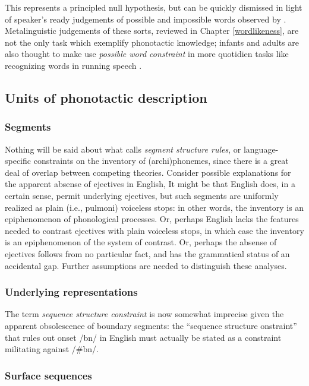 This represents a principled null hypothesis, but can be quickly dismissed in light of speaker's ready judgements of possible and impossible words observed by \citeauthor{Chomsky1965}. Metalinguistic judgements of these sorts, reviewed in Chapter \ref{wordlikeness}, are not the only task which exemplify phonotactic knowledge; infants and adults are also thought to make use \emph{possible word constraint} in more quotidien tasks like recognizing words in running speech \citep[e.g.,][]{Brown1956,Mattys1999,McQueen1998b,Norris1997}.

\subsection{Units of phonotactic description}

\subsubsection{Segments}

Nothing will be said about what \citet{Stanley1967} calls \emph{segment structure rules}, or language-specific constraints on the inventory of (archi)phonemes, since there is a great deal of overlap between competing theories. Consider possible explanations for the apparent absense of ejectives in English, It might be that English does, in a certain sense, permit underlying ejectives, but such segments are uniformly realized as plain (i.e., pulmoni) voiceless stops: in other words, the inventory is an epiphenomenon of phonological processes. Or, perhaps English lacks the features needed to contrast ejectives with plain voiceless stops, in which case the inventory is an epiphenomenon of the system of contrast. Or, perhaps the absense of ejectives follows from no particular fact, and has the grammatical status of an accidental gap. Further assumptions are needed to distinguish these analyses.

\subsubsection{Underlying representations}

The term \emph{sequence structure constraint} is now somewhat imprecise given the apparent obsolescence of boundary segments: the ``sequence structure onstraint'' that rules out onset /bn/ in English must actually be stated as a constraint militating against /\#bn/. \citep[149]{Kenstowicz1977}

\subsubsection{Surface sequences}


